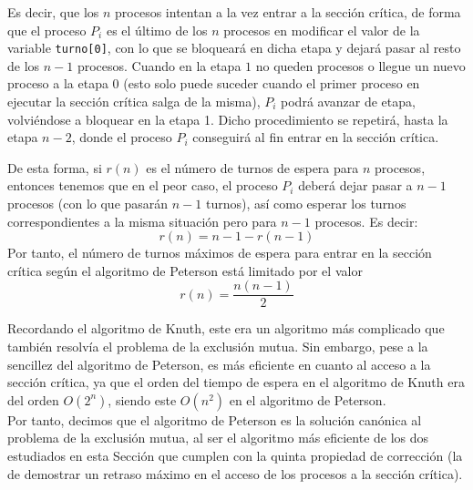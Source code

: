 \begin{description}
        Es decir, que los $n$ procesos intentan a la vez entrar a la sección crítica, de forma que el proceso $P_i$ es el último de los $n$ procesos en modificar el valor de la variable \verb|turno[0]|, con lo que se bloqueará en dicha etapa y dejará pasar al resto de los $n-1$ procesos. Cuando en la etapa $1$ no queden procesos o llegue un nuevo proceso a la etapa 0 (esto solo puede suceder cuando el primer proceso en ejecutar la sección crítica salga de la misma), $P_i$ podrá avanzar de etapa, volviéndose a bloquear en la etapa 1. Dicho procedimiento se repetirá, hasta la etapa $n-2$, donde el proceso $P_i$ conseguirá al fin entrar en la sección crítica.

        De esta forma, si $r(n)$ es el número de turnos de espera para $n$ procesos, entonces tenemos que en el peor caso, el proceso $P_i$ deberá dejar pasar a $n-1$ procesos (con lo que pasarán $n-1$ turnos), así como esperar los turnos correspondientes a la misma situación pero para $n-1$ procesos. Es decir:
        \begin{equation*}
            r(n) = n-1-r(n-1)
        \end{equation*}
        Por tanto, el número de turnos máximos de espera para entrar en la sección crítica según el algoritmo de Peterson está limitado por el valor
        \begin{equation*}
            r(n) = \dfrac{n(n-1)}{2}
        \end{equation*}
\end{description}

Recordando el algoritmo de Knuth, este era un algoritmo más complicado que también resolvía el problema de la exclusión mutua. Sin embargo, pese a la sencillez del algoritmo de Peterson, es más eficiente en cuanto al acceso a la sección crítica, ya que el orden del tiempo de espera en el algoritmo de Knuth era del orden $O(2^n)$, siendo este $O(n^2)$ en el algoritmo de Peterson.\\

Por tanto, decimos que el algoritmo de Peterson es la solución canónica al problema de la exclusión mutua, al ser el algoritmo más eficiente de los dos estudiados en esta Sección que cumplen con la quinta propiedad de corrección (la de demostrar un retraso máximo en el acceso de los procesos a la sección crítica).



